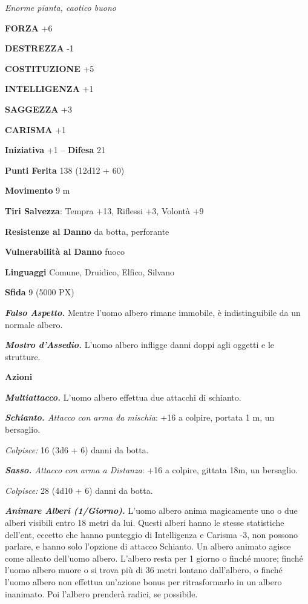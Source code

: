 \begin{multicols}{2}
\textit{Enorme pianta, caotico buono}

\textbf{FORZA} +6

\textbf{DESTREZZA} -1

\textbf{COSTITUZIONE} +5

\textbf{INTELLIGENZA} +1

\textbf{SAGGEZZA} +3

\textbf{CARISMA} +1

\textbf{Iniziativa} +1 -- \textbf{Difesa} 21

\textbf{Punti Ferita} 138 (12d12 + 60)

\textbf{Movimento} 9 m

\textbf{Tiri Salvezza}: Tempra +13, Riflessi +3, Volontà +9

\textbf{Resistenze al Danno} da botta, perforante

\textbf{Vulnerabilità al Danno} fuoco

\textbf{Linguaggi} Comune, Druidico, Elfico, Silvano

\textbf{Sfida} 9 (5000 PX)

\textit{\textbf{Falso Aspetto.}} Mentre l'uomo albero rimane immobile, è indistinguibile da un normale albero.

\textit{\textbf{Mostro d'Assedio.}} L'uomo albero infligge danni doppi agli oggetti e le strutture.

\textbf{Azioni}

\textit{\textbf{Multiattacco.}} L'uomo albero effettua due attacchi di schianto.

\textit{\textbf{Schianto.} Attacco con arma da mischia}: +16 a colpire, portata 1 m, un bersaglio.

\textit{Colpisce:} 16 (3d6 + 6) danni da botta.

\textit{\textbf{Sasso.} Attacco con arma a Distanza}: +16 a colpire, gittata 18m, un bersaglio.

\textit{Colpisce:} 28 (4d10 + 6) danni da botta.

\textit{\textbf{Animare Alberi (1/Giorno).}} L'uomo albero anima magicamente uno o due alberi visibili entro 18 metri da lui. Questi alberi hanno le stesse statistiche dell'ent, eccetto che hanno punteggio di Intelligenza e Carisma -3, non possono parlare, e hanno solo l'opzione di attacco Schianto. Un albero animato agisce come alleato dell'uomo albero. L'albero resta per 1 giorno o finché muore; finché l'uomo albero muore o si trova più di 36 metri lontano dall'albero, o finché l'uomo albero non effettua un'azione bonus per ritrasformarlo in un albero inanimato. Poi l'albero prenderà radici, se possibile.


\end{multicols}
